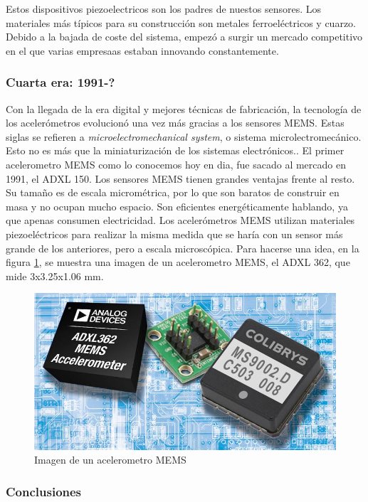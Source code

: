 \documentclass[12pt]{article}
\numberwithin{equation}{section}
\begin{document}
{Estos dispositivos piezoelectricos son los padres de nuestos sensores. Los materiales más típicos para su construcción son metales ferroeléctricos y cuarzo. Debido a la bajada de coste del sistema, empezó a surgir un mercado competitivo en el que varias empresaas estaban innovando constantemente.

\subsubsection{Cuarta era: 1991-?}

Con la llegada de la era digital y mejores técnicas de fabricación, la tecnología de los acelerómetros evolucionó una vez más gracias a los sensores MEMS. Estas siglas se refieren a \textit{microelectromechanical system}, o sistema microlectromecánico. Esto no es más que la miniaturización de los sistemas electrónicos.. El primer acelerometro MEMS como lo conocemos hoy en dia, fue sacado al mercado en 1991, el ADXL 150. Los sensores MEMS tienen grandes ventajas frente al resto. Su tamaño es de escala micrométrica, por lo que son baratos de construir en masa y no ocupan mucho espacio. Son eficientes energéticamente hablando, ya que apenas consumen electricidad. Los acelerómetros MEMS utilizan materiales piezoeléctricos para realizar la misma medida que se haría con un sensor más grande de los anteriores, pero a escala microscópica. Para hacerse una idea, en la figura \ref{fig:acelerometro}, se muestra una imagen de un acelerometro MEMS, el ADXL 362, que mide 3x3.25x1.06 mm.

\begin{figure}[h]
    \centering
    \includegraphics[width=1\textwidth]{MEMSpromo.jpg}
    \caption{Imagen de un acelerometro MEMS}
    \label{fig:acelerometro}
\end{figure}

\subsubsection{Conclusiones}

}
\end{document}
